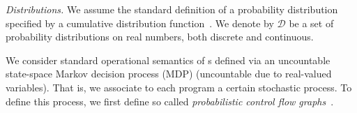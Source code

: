 \emph{Distributions.} We assume the standard definition of a probability 
distribution specified by a cumulative distribution 
function~\cite{Billingsley:book}. We denote by $\mathcal{D}$ be a set of 
probability distributions on 
real numbers, both discrete and continuous.

\smallskip{}
We consider standard operational semantics of \PP{}s defined via an 
uncountable state-space
Markov decision process (MDP) (uncountable due to real-valued variables).
That is, we associate to each program 
a certain stochastic process.
To define this process, we first define so called 
\emph{probabilistic control flow graphs}~\cite{CFG16}.

